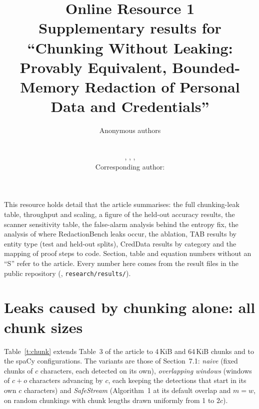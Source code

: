 \documentclass[11pt,a4paper]{article}
\title{Online Resource 1\\[4pt]\large Supplementary results for ``Chunking Without Leaking: Provably Equivalent, Bounded-Memory Redaction of Personal Data and Credentials''}
\author{Anonymous authors}
\author{\ssAuthorList\\
\small \ssDept, \ssOrg, \ssCity, \ssCountry\\
\small Corresponding author: \ssCorresponding}
\date{}
\begin{document}
\maketitle

\noindent This resource holds detail that the article summarises: the full chunking-leak table, throughput and scaling, a figure of the held-out accuracy results, the scanner sensitivity table, the false-alarm analysis behind the entropy fix, the analysis of where RedactionBench leaks occur, the ablation, TAB results by entity type (test and held-out splits), CredData results by category and the mapping of proof steps to code. Section, table and equation numbers without an ``S'' refer to the article. Every number here comes from the result files in the public repository (\repolink{}, \texttt{research/results/}).

\section{Leaks caused by chunking alone: all chunk sizes}\label{s:chunk}

Table~\ref{t:chunk} extends Table~3 of the article to 4\,KiB and 64\,KiB chunks and to the spaCy configurations. The variants are those of Section~7.1: \emph{naive} (fixed chunks of $c$ characters, each detected on its own), \emph{overlapping windows} (windows of $c + o$ characters advancing by $c$, each keeping the detections that start in its own $c$ characters) and \emph{SafeStream} (Algorithm~1 at its default overlap and $m = w$, on random chunkings with chunk lengths drawn uniformly from 1 to $2c$).
\end{document}
